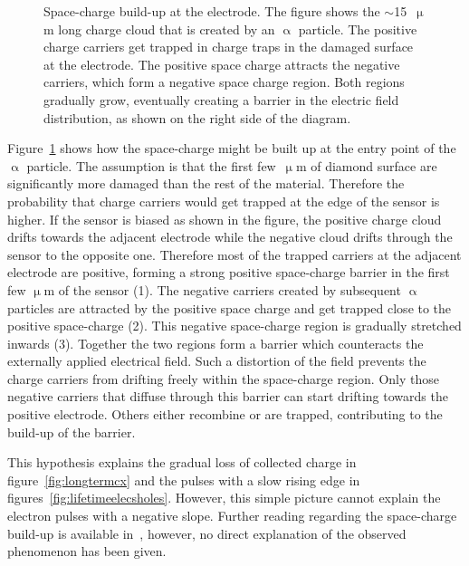 \begin{description}
\begin{figure}[!t]
\begin{center}
\caption{Space-charge build-up at the electrode. The figure shows the $\sim$15~$\upmu$m long charge cloud that is created by an $\upalpha$ particle. The positive charge carriers get trapped in charge traps in the damaged surface at the electrode. The positive space charge attracts the negative carriers, which form a negative space charge region. Both regions gradually grow, eventually creating a barrier in the electric field distribution, as shown on the right side of the diagram.}
\label{fig:elfield}
\end{center}
\end{figure}

Figure~\ref{fig:elfield} shows how the space-charge might be built up at the entry point of the $\upalpha$ particle. The assumption is that the first few~$\upmu$m of diamond surface are significantly more damaged than the rest of the material. Therefore the probability that charge carriers would get trapped at the edge of the sensor is higher. If the sensor is biased as shown in the figure, the positive charge cloud drifts towards the adjacent electrode while the negative cloud drifts through the sensor to the opposite one. Therefore most of the trapped carriers at the adjacent electrode are positive, forming a strong positive space-charge barrier in the first few $\upmu$m of the sensor (1). The negative carriers created by subsequent $\upalpha$ particles are attracted by the positive space charge and get trapped close to the positive space-charge (2). This negative space-charge region is gradually stretched inwards (3). Together the two regions form a barrier which counteracts the externally applied electrical field. Such a distortion of the field prevents the charge carriers from drifting freely within the space-charge region. Only those negative carriers that diffuse through this barrier can start drifting towards the positive electrode. Others either recombine or are trapped, contributing to the build-up of the barrier. 

This hypothesis explains the gradual loss of collected charge in figure~\ref{fig:longtermcx} and the pulses with a slow rising edge in figures~\ref{fig:lifetimeelecsholes}. However, this simple picture cannot explain the electron pulses with a negative slope. Further reading regarding the space-charge build-up is available in~\cite{Eremin2002537,	4327634, s150613424}, however, no direct explanation of the observed phenomenon has been given.

\end{description}







